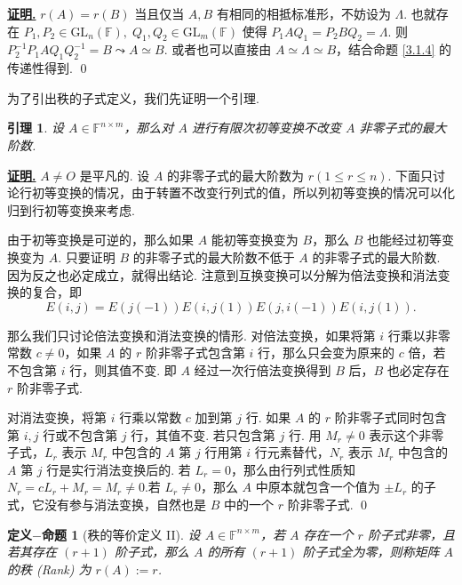 \documentclass[10pt,openany]{article}
\theoremstyle{thmstyle} %
\theoremstyle{defstyle} %
\newtheorem{defprop}[theorem]{定义\(-\)命题}
\newtheorem{lemma}[theorem]{引理}
\theoremstyle{prostyle} %
\theoremstyle{exastyle}
\theoremstyle{remstyle}
\renewenvironment{proof}[1][证明]{\par\underline{\textbf{#1.}} \;\fangsong}{\qed\par}
\newcommand{\F}{\mathbb{F}}
\newcommand{\gfn}{\text{GL}_n(\mathbb{F})}
\newcommand{\gfm}{\text{GL}_m(\mathbb{F})}
\newcommand{\nm}{^{n \times m}}
\begin{document}
\begin{proof}
	\( r(A)=r(B) \) 当且仅当 \( A,B \) 有相同的相抵标准形，不妨设为 \( \Lambda \). 也就存在 \( P_1,P_2 \in \gfn, \; Q_1,Q_2 \in \gfm \) 使得 \( P_1AQ_1=P_2BQ_2=\Lambda \). 则 \( P_2^{-1}P_1AQ_1Q_2^{-1}=B \leadsto A \simeq B \). 或者也可以直接由 \( A \simeq \Lambda \simeq B \)，结合命题 \ref{3.1.4} 的传递性得到.
\end{proof}

为了引出秩的子式定义，我们先证明一个引理.

\begin{lemma} \label{3.1.8}
	设 \( A \in \F\nm \)，那么对 \( A \) 进行有限次初等变换不改变 \( A \) 非零子式的最大阶数.
\end{lemma}

\begin{proof}
	 \( A \neq O \) 是平凡的. 设 \( A \) 的非零子式的最大阶数为 \( r (1 \leq r \leq n) \). 下面只讨论行初等变换的情况，由于转置不改变行列式的值，所以列初等变换的情况可以化归到行初等变换来考虑. 
	 
	 由于初等变换是可逆的，那么如果 \( A \) 能初等变换变为 \( B \)，那么 \( B \) 也能经过初等变换变为 \( A \). 只要证明 \( B \) 的非零子式的最大阶数不低于 \( A \) 的非零子式的最大阶数. 因为反之也必定成立，就得出结论. 注意到互换变换可以分解为倍法变换和消法变换的复合，即
	 \[ E(i,j)=E(j(-1))E(i,j(1))E(j,i(-1))E(i,j(1)). \]
	 
	 那么我们只讨论倍法变换和消法变换的情形. 对倍法变换，如果将第 \( i \) 行乘以非零常数 \( c \neq 0 \)，如果 \( A \) 的 \( r \) 阶非零子式包含第 \( i \) 行，那么只会变为原来的 \( c \) 倍，若不包含第 \( i \) 行，则其值不变. 即 \( A \) 经过一次行倍法变换得到 \( B \) 后，\( B \) 也必定存在 \( r \) 阶非零子式.
	 
	 对消法变换，将第 \( i \) 行乘以常数 \( c \) 加到第 \( j \) 行. 如果 \( A \) 的 \( r \) 阶非零子式同时包含第 \( i,j \) 行或不包含第 \( j \) 行，其值不变. 若只包含第 \( j \) 行. 用 \( M_r \neq 0  \) 表示这个非零子式，\( L_r \) 表示 \( M_r \) 中包含的 \( A \) 第 \( j \) 行用第 \( i \) 行元素替代，\( N_r \) 表示 \( M_r \) 中包含的 \( A \) 第 \( j \) 行是实行消法变换后的. 若 \( L_r=0 \)，那么由行列式性质知 \( N_r=cL_r+M_r=M_r \neq 0 \).若 \( L_r \neq 0 \)，那么 \( A \) 中原本就包含一个值为 \( \pm L_r \) 的子式，它没有参与消法变换，自然也是 \( B \) 中的一个 \( r \) 阶非零子式.
\end{proof}

\begin{defprop}[秩的等价定义 II] \label{3.1.9}
	设 \( A \in \F\nm \)，若 \( A \) 存在一个 \( r \) 阶子式非零，且若其存在 \( (r+1) \) 阶子式，那么 \( A \) 的所有  \( (r+1) \) 阶子式全为零，则称矩阵 \( A \) 的秩 (Rank) 为 \( r(A):=r \).
\end{defprop}
\end{document}
